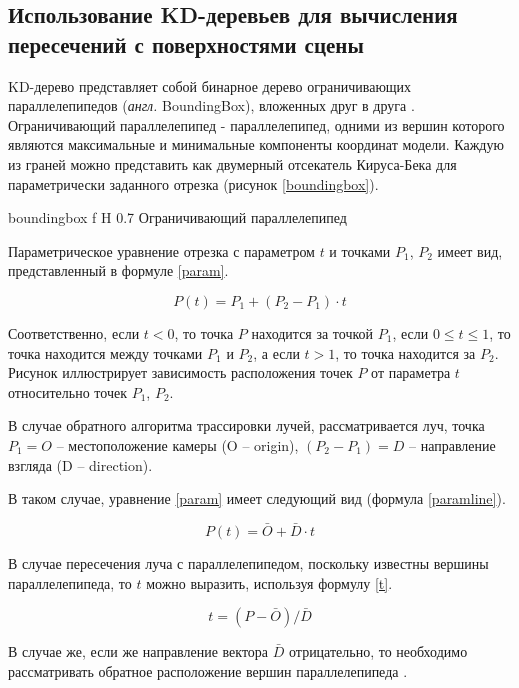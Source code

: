 \subsection{Использование KD-деревьев для вычисления пересечений с поверхностями сцены}

KD-дерево представляет собой бинарное дерево ограничивающих параллелепипедов (\textit{англ.} BoundingBox), вложенных друг в друга \cite{kdtree}. 
Ограничивающий параллелепипед - параллелепипед, одними из вершин которого являются максимальные и минимальные компоненты координат модели. Каждую из граней можно представить как двумерный отсекатель Кируса-Бека для параметрически заданного отрезка \cite{rogers} (рисунок \ref{boundingbox}).

{boundingbox}
{f}
{H}
{0.7\textwidth}
{Ограничивающий параллелепипед}

Параметрическое уравнение отрезка с параметром $t$  и точками $P_1$, $P_2$ имеет вид, представленный в формуле \ref{param}.

\begin{equation}
	\label{param}
	P(t) = P_1 + (P_2 - P_1) \cdot t
\end{equation}

Соответственно, если $t < 0$, то точка $P$ находится за точкой $P_1$, если $0 \leq t \leq 1$, то точка находится между точками $P_1$ и $P_2$, а если $t > 1$, то точка находится за $P_2$. Рисунок иллюстрирует зависимость расположения точек $P$ от параметра $t$ относительно точек $P_1$, $P_2$.

В случае обратного алгоритма трассировки лучей, рассматривается луч, точка $P_1 = O$ --  местоположение камеры (O -- origin), $(P_2 - P_1) = D$ -- направление взгляда (D -- direction). 

В таком случае, уравнение \ref{param} имеет следующий вид (формула \ref{paramline}).

\begin{equation}
	\label{paramline}
	P(t) =  \bar{O} + \bar{D} \cdot t
\end{equation}

В случае пересечения луча с параллелепипедом, поскольку известны вершины параллелепипеда, то $t$ можно выразить, используя формулу \ref{t}.

\begin{equation}
	\label{t}
	t = (P - \bar{O}) / \bar{D}
\end{equation}

В случае же,  если же направление вектора $\bar{D}$ отрицательно, то необходимо рассматривать обратное расположение вершин параллелепипеда \cite{rogers}.

